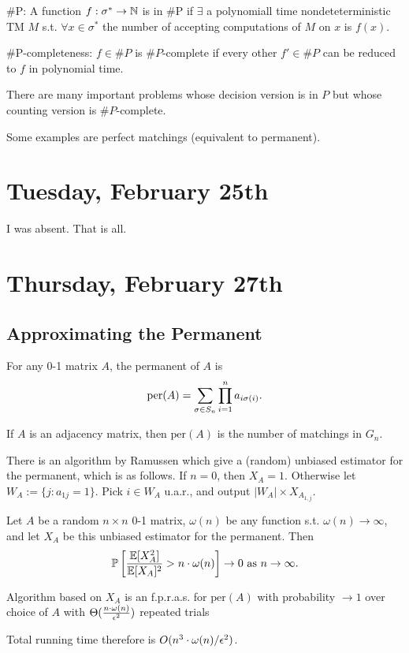 \documentclass[11 pt]{scrartcl}
\newcommand{\per}{\text{per}}
\begin{document}
\#P: A function $f: \sigma^* \to \mathbb N$ is in \#P if $\exists$ a polynomiall time nondeteterministic TM $M$ s.t. $\forall x \in \sigma^*$ the number of accepting computations of $M$ on $x$ is $f(x)$. 

\#P-completeness: $f\in \#P$ is $\#P$-complete if every other $f'\in\# P$ can be reduced to $f$ in polynomial time. 

\begin{fact}
    There are many important problems whose decision version is in $P$ but whose counting version is $\#P$-complete. 
\end{fact}
Some examples are perfect matchings (equivalent to permanent). 

\section{Tuesday, February 25th}
I was absent. That is all.

\newpage
\section{Thursday, February 27th}

\subsection{Approximating the Permanent}
For any 0-1 matrix $A$, the permanent of $A$ is 
\[ \per(A) = \sum_{\si\in S_n} \prod_{i=1}^n a_{i\si(i)}.\] 

If $A$ is an adjacency matrix, then $\per(A)$ is the number of matchings in $G_n$. 

There is an algorithm by Ramussen which give a (random) unbiased estimator for the permanent, which is as follows. If $n = 0$, then $X_A = 1$. Otherwise let $W_A := \{j: a_{1j} = 1\}$. Pick $i\in W_A$ u.a.r., and output $|W_A|\times X_{A_{1,j}}$. 

\begin{theorem}
    Let $A$ be a random $n\times n$ 0-1 matrix, $\omega(n)$ be any function s.t. $\omega(n) \to \infty$, and let $X_A$ be this unbiased estimator for the permanent. Then 
    \[ \mathbb P\left[\dfrac{\mathbb E[X_A^2]}{\mathbb E[X_A]^2} > n\cdot \omega(n)\right] \to 0 \text{ as } n\to\infty.\] 
\end{theorem}
\begin{corollary}
    Algorithm based on $X_A$ is an f.p.r.a.s. for $\per(A)$ with probability $\to 1$ over choice of $A$ with $\Theta(\frac{n\cdot \omega(n)}{\epsilon^2})$ repeated trials
\end{corollary}
Total running time therefore is $O(n^3\cdot \omega(n)/\epsilon^2)$. 
\end{document}
